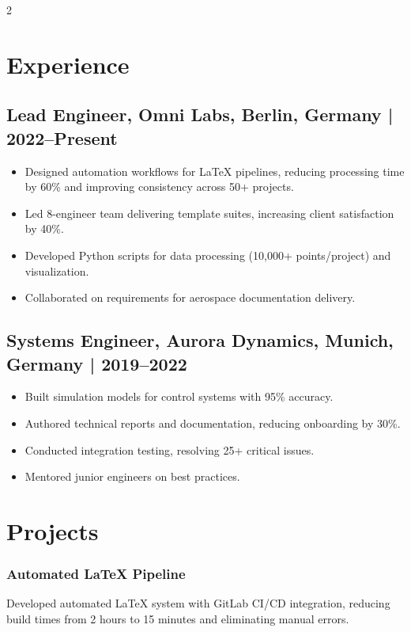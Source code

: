 \documentclass[
    language=english,
    doctype=cv,
    institution=none,
    titlestyle=simple
]{../../omnilatex}
\begin{document}
\maketitle

\begin{multicols}{2}

    \section{Experience}
    \subsection{Lead Engineer, Omni Labs, Berlin, Germany | 2022--Present}
    \begin{itemize}
        \item Designed automation workflows for LaTeX pipelines, reducing processing time by 60\% and improving consistency across 50+ projects.
        \item Led 8-engineer team delivering template suites, increasing client satisfaction by 40\%.
        \item Developed Python scripts for data processing (10,000+ points/project) and visualization.
        \item Collaborated on requirements for aerospace documentation delivery.
    \end{itemize}

    \subsection{Systems Engineer, Aurora Dynamics, Munich, Germany | 2019--2022}
    \begin{itemize}
        \item Built simulation models for control systems with 95\% accuracy.
        \item Authored technical reports and documentation, reducing onboarding by 30\%.
        \item Conducted integration testing, resolving 25+ critical issues.
        \item Mentored junior engineers on best practices.
    \end{itemize}

    \section{Projects}
    \subsubsection{Automated LaTeX Pipeline \faLink}
    Developed automated LaTeX system with GitLab CI/CD integration, reducing build times from 2 hours to 15 minutes and eliminating manual errors.


\end{multicols}
\end{document}
